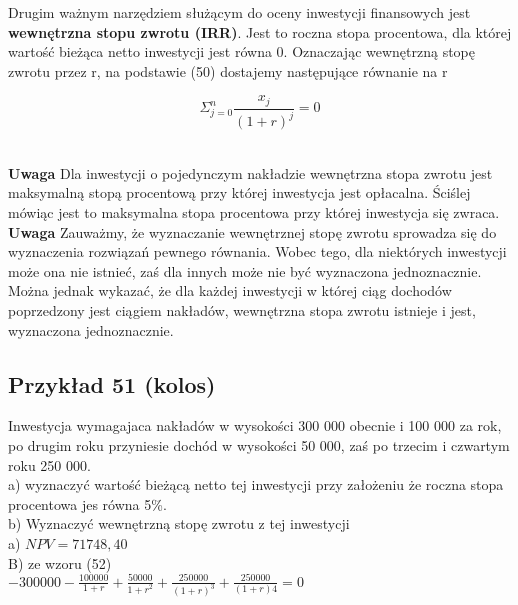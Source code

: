 \documentclass{article}
\begin{document}
Drugim ważnym narzędziem służącym do oceny inwestycji finansowych jest \textbf{wewnętrzna stopu zwrotu (IRR)}. Jest to roczna stopa procentowa, dla której wartość bieżąca netto inwestycji jest równa 0. Oznaczając wewnętrzną stopę zwrotu przez r, na podstawie (50) dostajemy następujące równanie na r

\begin{center}
	\begin{equation}
		\Sigma ^n_{j=0}\frac{x_j}{(1 + r)^j} = 0
	\end{equation}
\end{center}\\

\textbf{Uwaga} Dla inwestycji o pojedynczym nakładzie wewnętrzna stopa zwrotu jest maksymalną stopą procentową przy której inwestycja jest opłacalna. Ściślej mówiąc jest to maksymalna stopa procentowa przy której inwestycja się zwraca.\\

\textbf{Uwaga} Zauważmy, że wyznaczanie wewnętrznej stopę zwrotu sprowadza się do wyznaczenia rozwiązań pewnego równania. Wobec tego, dla niektórych inwestycji może ona nie istnieć, zaś dla innych może nie być wyznaczona jednoznacznie. Można jednak wykazać, że dla każdej inwestycji w której ciąg dochodów poprzedzony jest ciągiem nakładów, wewnętrzna stopa zwrotu istnieje i jest, wyznaczona jednoznacznie. 

\subsection{Przykład 51 (kolos)}

Inwestycja wymagajaca nakładów w wysokości 300 000 obecnie i 100 000 za rok, po drugim roku przyniesie dochód w wysokości 50 000, zaś po trzecim i czwartym roku 250 000.\\

a) wyznaczyć wartość bieżącą netto tej inwestycji przy założeniu że roczna stopa procentowa jes równa 5\%.\\

b) Wyznaczyć wewnętrzną stopę zwrotu z tej inwestycji\\

a) $ NPV = 71 748,40 $\\

B) ze wzoru (52)\\

$ -300000 - \frac{100000}{1 + r} + \frac{50 000}{{1 + r}^2} + \frac{250 000}{(1 + r)^3} + \frac{250 000}{(1 + r)4} = 0 $\\
\end{document}
